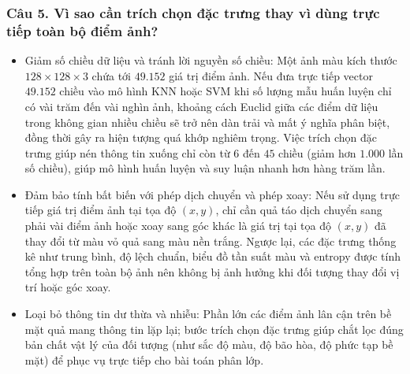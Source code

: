 \documentclass[12pt,a4paper]{article}
\begin{document}
\subsubsection*{Câu 5. Vì sao cần trích chọn đặc trưng thay vì dùng trực tiếp toàn bộ điểm ảnh?}
\begin{itemize}
    \item Giảm số chiều dữ liệu và tránh lời nguyền số chiều: Một ảnh màu kích thước $128 \times 128 \times 3$ chứa tới $49.152$ giá trị điểm ảnh. Nếu đưa trực tiếp vector $49.152$ chiều vào mô hình KNN hoặc SVM khi số lượng mẫu huấn luyện chỉ có vài trăm đến vài nghìn ảnh, khoảng cách Euclid giữa các điểm dữ liệu trong không gian nhiều chiều sẽ trở nên dàn trải và mất ý nghĩa phân biệt, đồng thời gây ra hiện tượng quá khớp nghiêm trọng. Việc trích chọn đặc trưng giúp nén thông tin xuống chỉ còn từ $6$ đến $45$ chiều (giảm hơn $1.000$ lần số chiều), giúp mô hình huấn luyện và suy luận nhanh hơn hàng trăm lần.
    \item Đảm bảo tính bất biến với phép dịch chuyển và phép xoay: Nếu sử dụng trực tiếp giá trị điểm ảnh tại tọa độ $(x, y)$, chỉ cần quả táo dịch chuyển sang phải vài điểm ảnh hoặc xoay sang góc khác là giá trị tại tọa độ $(x, y)$ đã thay đổi từ màu vỏ quả sang màu nền trắng. Ngược lại, các đặc trưng thống kê như trung bình, độ lệch chuẩn, biểu đồ tần suất màu và entropy được tính tổng hợp trên toàn bộ ảnh nên không bị ảnh hưởng khi đối tượng thay đổi vị trí hoặc góc xoay.
    \item Loại bỏ thông tin dư thừa và nhiễu: Phần lớn các điểm ảnh lân cận trên bề mặt quả mang thông tin lặp lại; bước trích chọn đặc trưng giúp chắt lọc đúng bản chất vật lý của đối tượng (như sắc độ màu, độ bão hòa, độ phức tạp bề mặt) để phục vụ trực tiếp cho bài toán phân lớp.
\end{itemize}
\end{document}
